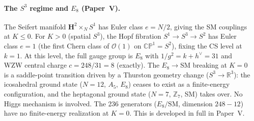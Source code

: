 \paragraph{The $S^3$ regime and $E_8$ (Paper~V).}
The Seifert manifold $\mathbf{H}^2 \times_N S^1$ has Euler class
$e = N/2$, giving the SM couplings at $K \le 0$.  For $K > 0$
(spatial $S^3$), the Hopf fibration $S^1 \to S^3 \to S^2$ has
Euler class $e = 1$ (the first Chern class of $\mathcal{O}(1)$ on
$\mathbb{CP}^1 = S^2$), fixing the CS level at $k = 1$.
At this level, the full gauge group is $E_8$ with
$1/g^2 = k + h^\vee = 31$ and WZW central charge
$c = 248/31 = 8$ (exactly).
The $E_8 \to \mathrm{SM}$ breaking at $K = 0$ is a
saddle-point transition driven by a Thurston geometry change
($S^3 \to \mathbb{R}^3$): the icosahedral ground state ($N = 12$,
$A_5$, $E_8$) ceases to exist as a finite-energy configuration,
and the heptagonal ground state ($N = 7$,
$\mathbb{Z}_7$, SM) takes over.  No Higgs mechanism is involved.
The 236 generators ($E_8/\mathrm{SM}$, dimension $248 - 12$)
have no finite-energy realization at $K = 0$.
This is developed in full in Paper~V.

